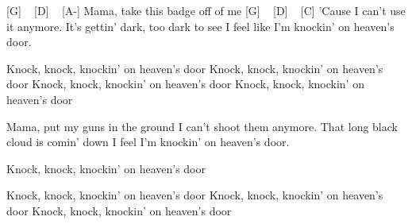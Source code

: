 
[G] ~ [D] ~ [A-]
Mama, take this badge off of me
[G] ~ [D] ~ [C]
'Cause I can't use it anymore.
It's gettin' dark, too dark to see
I feel like I'm knockin' on heaven's door.

Knock, knock, knockin' on heaven's door
Knock, knock, knockin' on heaven's door
Knock, knock, knockin' on heaven's door
Knock, knock, knockin' on heaven's door

Mama, put my guns in the ground
I can't shoot them anymore.
That long black cloud is comin' down
I feel I'm knockin' on heaven's door.

Knock, knock, knockin' on heaven's door

Knock, knock, knockin' on heaven's door
Knock, knock, knockin' on heaven's door
Knock, knock, knockin' on heaven's door
